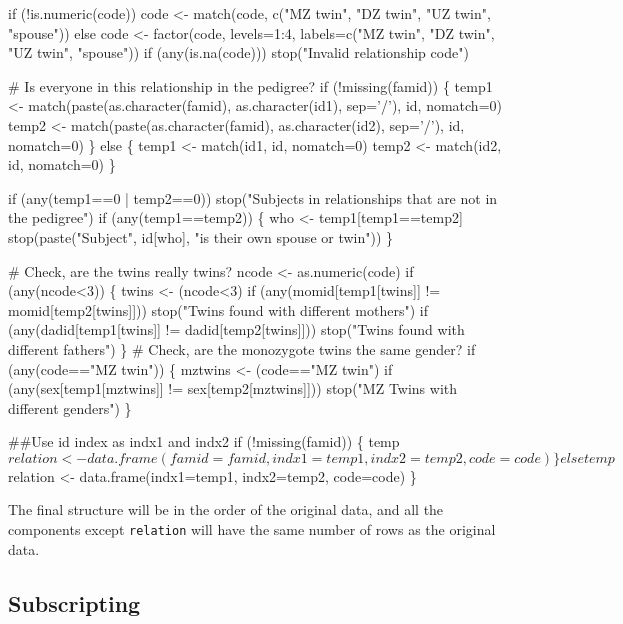 \documentclass{article}
\begin{document}
\begin{nwchunk}
     if (!is.numeric(code))
         code <- match(code, c("MZ twin", "DZ twin", "UZ twin", "spouse"))
     else code <- factor(code, levels=1:4,
                         labels=c("MZ twin", "DZ twin", "UZ twin", "spouse"))
     if (any(is.na(code)))
         stop("Invalid relationship code")
      
     # Is everyone in this relationship in the pedigree?
     if (!missing(famid)) \{
         temp1 <- match(paste(as.character(famid), as.character(id1), sep='/'), 
                        id, nomatch=0)
         temp2 <- match(paste(as.character(famid), as.character(id2), sep='/'),
                        id, nomatch=0)
       \}
     else \{
         temp1 <- match(id1, id, nomatch=0)
         temp2 <- match(id2, id, nomatch=0)
       \}
     
     if (any(temp1==0 | temp2==0))
         stop("Subjects in relationships that are not in the pedigree")
     if (any(temp1==temp2)) \{
         who <- temp1[temp1==temp2]
         stop(paste("Subject", id[who], "is their own spouse or twin"))
         \}
 
     # Check, are the twins really twins?
     ncode <- as.numeric(code)
     if (any(ncode<3)) \{
         twins <- (ncode<3)
         if (any(momid[temp1[twins]] != momid[temp2[twins]]))
             stop("Twins found with different mothers")
         if (any(dadid[temp1[twins]] != dadid[temp2[twins]]))
             stop("Twins found with different fathers")
         \}
     # Check, are the monozygote twins the same gender?
     if (any(code=="MZ twin")) \{
         mztwins <- (code=="MZ twin")
         if (any(sex[temp1[mztwins]] != sex[temp2[mztwins]]))
             stop("MZ Twins with different genders")
         \}
 
     ##Use id index as indx1 and indx2
     if (!missing(famid)) \{
         temp$relation <- data.frame(famid=famid, indx1=temp1, indx2=temp2, code=code)
         
       \}
     else temp$relation <- data.frame(indx1=temp1, indx2=temp2, code=code)
     \}
\end{nwchunk}

The final structure will be in the order of the original data, and all the
components except \Verb!relation! will have the
same number of rows as the original data.


\subsection{Subscripting}
\end{document}
